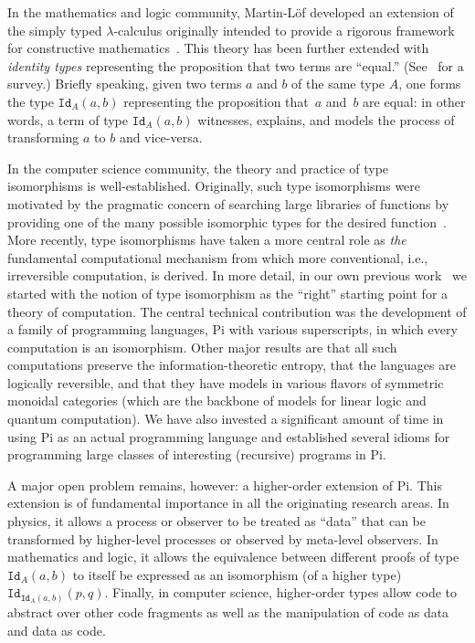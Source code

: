 \documentclass{llncs}
\begin{document}
In the mathematics and logic community, Martin-L\"of developed an extension
of the simply typed $\lambda$-calculus originally intended to provide a
rigorous framework for constructive
mathematics~\cite{citeulike:7374951}. This theory has been further extended
with \emph{identity types} representing the proposition that two terms are
``equal.'' (See~\cite{streicher,warren} for a survey.) Briefly speaking,
given two terms $a$ and $b$ of the same type $A$, one forms the type
$\texttt{Id}_A(a,b)$ representing the proposition that~$a$ and~$b$ are equal:
in other words, a term of type $\texttt{Id}_A(a,b)$ witnesses, explains, and
models the process of transforming $a$ to $b$ and vice-versa.

In the computer science community, the theory and practice of type
isomorphisms is well-established. Originally, such type isomorphisms were
motivated by the pragmatic concern of searching large libraries of functions
by providing one of the many possible isomorphic types for the desired
function~\cite{Rittri:1989:UTS:99370.99384}. More recently, type isomorphisms
have taken a more central role as \emph{the} fundamental computational
mechanism from which more conventional, i.e., irreversible computation, is
derived. In more detail, in our own previous
work~\cite{James:2012:IE:2103656.2103667,rc2011,rc2012} we started with the
notion of type isomorphism as the ``right'' starting point for a theory of
computation. The central technical contribution was the development of a
family of programming languages, {{Pi}} with various superscripts, in which
every computation is an isomorphism. Other major results are that all such
computations preserve the information-theoretic entropy, that the languages
are logically reversible, and that they have models in various flavors of
symmetric monoidal categories (which are the backbone of models for linear
logic and quantum computation). We have also invested a significant amount of
time in using {{Pi}} as an actual programming language and established
several idioms for programming large classes of interesting (recursive)
programs in {{Pi}}.

A major open problem remains, however: a higher-order extension of
{{Pi}}. This extension is of fundamental importance in all the originating
research areas. In physics, it allows a process or observer to be treated as
``data'' that can be transformed by higher-level processes or observed by
meta-level observers. In mathematics and logic, it allows the equivalence
between different proofs of type $\texttt{Id}_A(a,b)$ to itself be expressed
as an isomorphism (of a higher type)
$\texttt{Id}_{\texttt{Id}_A(a,b)}(p,q)$. Finally, in computer science,
higher-order types allow code to abstract over other code fragments as well
as the manipulation of code as data and data as code.
\end{document}
